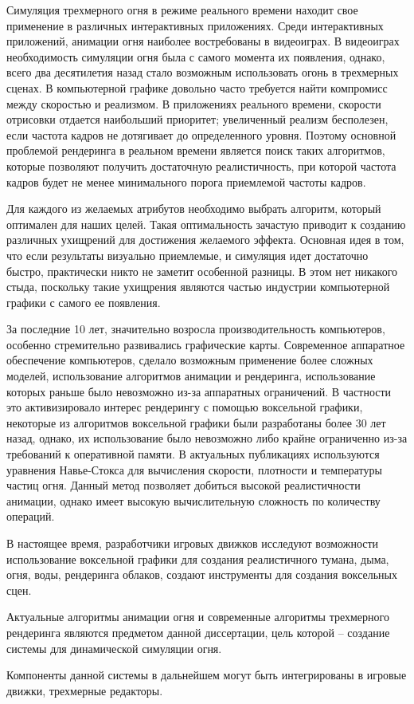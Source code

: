 Симуляция трехмерного огня в режиме реального времени находит свое применение в
различных интерактивных приложениях. Среди интерактивных приложений,
анимации огня наиболее востребованы в видеоиграх. В видеоиграх необходимость
симуляции огня была с самого момента их появления, однако, всего два
десятилетия назад стало возможным использовать огонь в трехмерных сценах.
В компьютерной графике довольно часто требуется найти компромисс между скоростью
и реализмом. В приложениях реального времени, скорости отрисовки отдается
наибольший приоритет; увеличенный реализм бесполезен, если частота кадров не
дотягивает до определенного уровня. Поэтому основной проблемой рендеринга в
реальном времени является поиск таких алгоритмов, которые позволяют получить
достаточную реалистичность, при которой частота кадров будет не менее
минимального порога
приемлемой частоты кадров.

Для каждого из желаемых атрибутов необходимо выбрать алгоритм, который оптимален
для наших целей. Такая оптимальность зачастую приводит к созданию различных
ухищрений для достижения желаемого эффекта. Основная идея в том, что если
результаты визуально приемлемые, и симуляция идет достаточно быстро, практически
никто не заметит особенной разницы. В этом нет никакого стыда, поскольку такие
ухищрения являются частью индустрии компьютерной графики с самого ее появления.

За последние 10 лет, значительно возросла производительность компьютеров,
особенно стремительно развивались графические карты. Современное аппаратное
обеспечение компьютеров, сделало возможным применение
более сложных моделей, использование алгоритмов анимации и рендеринга,
использование которых раньше было невозможно из-за аппаратных ограничений. В
частности это активизировало интерес рендерингу с помощью воксельной графики,
некоторые из алгоритмов воксельной графики были разработаны более 30 лет назад,
однако, их использование было невозможно либо крайне ограниченно из-за
требований к оперативной памяти. В актуальных публикациях используются уравнения
Навье-Стокса для вычисления скорости, плотности и температуры частиц огня.
Данный метод позволяет добиться высокой реалистичности анимации, однако имеет
высокую вычислительную сложность по количеству операций.

В настоящее время, разработчики игровых движков исследуют возможности
использование воксельной графики для создания реалистичного тумана,
дыма, огня, воды, рендеринга облаков, создают инструменты для создания
воксельных сцен.

Актуальные алгоритмы анимации огня и современные алгоритмы трехмерного рендеринга
являются предметом данной диссертации, цель которой -- создание системы для
динамической симуляции огня.

Компоненты данной системы в дальнейшем могут быть интегрированы в
игровые движки, трехмерные редакторы.
